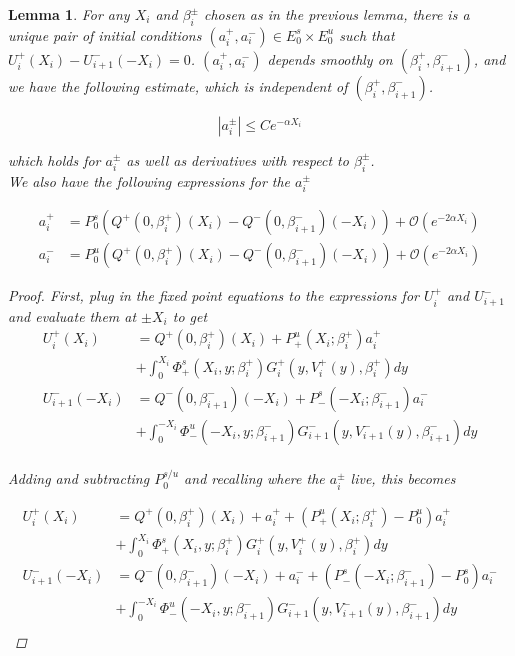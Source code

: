 \documentclass[12pt]{article}
\newtheorem{lemma}{Lemma}
\begin{document}
\begin{lemma}\label{solvefora}
For any $X_i$ and $\beta_i^\pm$ chosen as in the previous lemma, there is a unique pair of initial conditions $(a_i^+, a_i^-) \in E_0^s \times E_0^u$ such that $U_i^+(X_i) - U_{i+1}^-(-X_i) = 0$. $(a_i^+, a_i^-)$ depends smoothly on $(\beta_i^+, \beta_{i+1}^-)$, and we have the following estimate, which is independent of $(\beta_i^+, \beta_{i+1}^-)$.

\begin{equation}
|a_i^\pm| \leq C e^{-\alpha X_i}
\end{equation}

which holds for $a_i^\pm$ as well as derivatives with respect to $\beta_i^\pm$.\\

We also have the following expressions for the $a_i^\pm$

\begin{align*}
a_i^+ &= P^s_0 \left( Q^+(0, \beta_i^+)(X_i) - Q^-(0, \beta_{i+1}^-)(-X_i) \right) 
+ \mathcal{O}( e^{-2 \alpha X_i} )\\
a_i^- &= P^u_0 \left( Q^+(0, \beta_i^+)(X_i) - Q^-(0, \beta_{i+1}^-)(-X_i) \right) 
+ \mathcal{O}( e^{-2 \alpha X_i} )
\end{align*}

\begin{proof}

First, plug in the fixed point equations to the expressions for $U_i^+$ and $U_{i+1}^-$ and evaluate them at $\pm X_i$ to get
\begin{align*}
U_i^+(X_i) &= Q^+(0, \beta_i^+)(X_i) + P^u_+(X_i; \beta_i^+) a_i^+ \\
&+ \int_0^{X_i} \Phi_+^s(X_i, y; \beta_i^+) G_i^+(y, V_i^+(y),\beta_i^+)dy \\ 
U_{i+1}^-(-X_i) &= Q^-(0, \beta_{i+1}^-)(-X_i) + P^s_-(-X_i; \beta_{i+1}^-) a_i^- \\
&+ \int_0^{-X_i} \Phi_-^u(-X_i, y; \beta_{i+1}^-) G_{i+1}^-(y, V_{i+1}^-(y),\beta_{i+1}^-)dy \\
\end{align*}

Adding and subtracting $P_0^{s/u}$ and recalling where the $a_i^\pm$ live, this becomes

\begin{align*}
U_i^+(X_i) &= Q^+(0, \beta_i^+)(X_i) + a_i^+ + (P^u_+(X_i; \beta_i^+) -  P^u_0)a_i^+ \\
&+ \int_0^{X_i} \Phi_+^s(X_i, y; \beta_i^+) G_i^+(y, V_i^+(y),\beta_i^+)dy \\ 
U_{i+1}^-(-X_i) &= Q^-(0, \beta_{i+1}^-)(-X_i) + a_i^- + (P^s_-(-X_i; \beta_{i+1}^-) - P^s_0) a_i^- \\ 
&+ \int_0^{-X_i} \Phi_-^u(-X_i, y; \beta_{i+1}^-) G_{i+1}^-(y, V_{i+1}^-(y),\beta_{i+1}^-)dy \\
\end{align*}


\end{proof}
\end{lemma}
\end{document}
